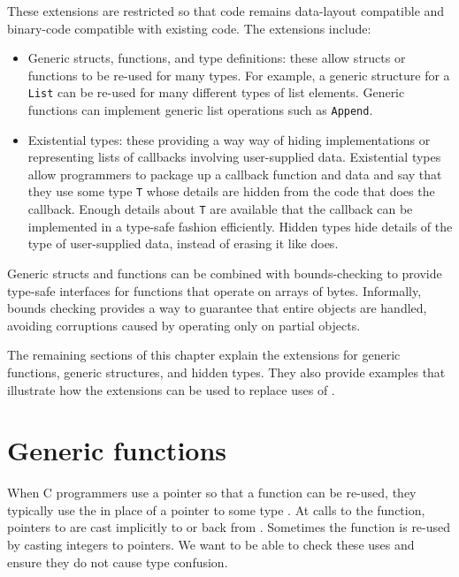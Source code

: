 These extensions are restricted so that code remains data-layout compatible and binary-code
compatible with existing code.  The extensions include:
\begin{itemize}
\item Generic structs, functions, and type definitions: these allow structs
or functions to be re-used for many types.   For example,
a generic structure for a  \lstinline+List+ can be re-used for many different types of list
elements.  Generic functions can implement generic list operations such as \lstinline+Append+.

\item Existential types: these providing a way way of hiding implementations or representing
lists of callbacks involving user-supplied data.  Existential types allow programmers to package
 up a callback function and data and
say that they use  some type \lstinline+T+ whose details are hidden from the code that does
the callback.   Enough details about \lstinline+T+ are available that the callback can be 
implemented in a type-safe fashion efficiently.  Hidden types hide details of the type
of user-supplied data, instead of erasing it like \uncheckedptrvoid{} does.
\end{itemize}

Generic structs and functions can be combined with bounds-checking 
to provide type-safe interfaces for functions that operate on arrays of bytes.
Informally, bounds checking provides a way to guarantee that entire objects are handled,
avoiding corruptions caused by operating only on partial objects.

The remaining sections of this chapter explain the extensions for generic functions, 
generic structures, and hidden types.  They also
provide examples that illustrate how the extensions can be used to
replace uses of \uncheckedptrvoid{}.



\section{Generic functions}
\label{sec:generic-functions}

When C programmers use a \uncheckedptrvoid{} pointer so that a function
can be re-used, they typically use the \uncheckedptrvoid{} in place of a pointer 
to some type .  At calls to the function, pointers to  are cast
implicitly to \uncheckedptrvoid{} or back from \uncheckedptrvoid{}.  
Sometimes the function is re-used by casting integers to \uncheckedptrvoid{} pointers.
We want to be able to check these uses and ensure they do not cause type confusion.

